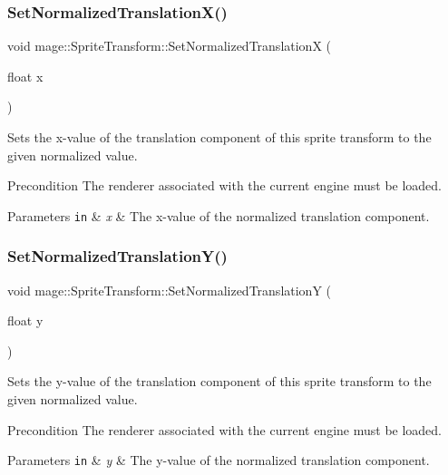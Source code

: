 \subsubsection{\texorpdfstring{Set\+Normalized\+Translation\+X()}{SetNormalizedTranslationX()}}
{\footnotesize\ttfamily void mage\+::\+Sprite\+Transform\+::\+Set\+Normalized\+TranslationX (\begin{DoxyParamCaption}\item[{float}]{x }\end{DoxyParamCaption})}

Sets the x-\/value of the translation component of this sprite transform to the given normalized value.

\begin{DoxyPrecond}{Precondition}
The renderer associated with the current engine must be loaded. 
\end{DoxyPrecond}

\begin{DoxyParams}[1]{Parameters}
\mbox{\tt in}  & {\em x} & The x-\/value of the normalized translation component. \\
\hline
\end{DoxyParams}
\hypertarget{structmage_1_1_sprite_transform_aa50268eff50bac9903f1cd2123260f6d}{}\label{structmage_1_1_sprite_transform_aa50268eff50bac9903f1cd2123260f6d} 
\subsubsection{\texorpdfstring{Set\+Normalized\+Translation\+Y()}{SetNormalizedTranslationY()}}
{\footnotesize\ttfamily void mage\+::\+Sprite\+Transform\+::\+Set\+Normalized\+TranslationY (\begin{DoxyParamCaption}\item[{float}]{y }\end{DoxyParamCaption})}

Sets the y-\/value of the translation component of this sprite transform to the given normalized value.

\begin{DoxyPrecond}{Precondition}
The renderer associated with the current engine must be loaded. 
\end{DoxyPrecond}

\begin{DoxyParams}[1]{Parameters}
\mbox{\tt in}  & {\em y} & The y-\/value of the normalized translation component. \\
\hline
\end{DoxyParams}
\hypertarget{structmage_1_1_sprite_transform_a95bfa3a9ef80d42682c41f663b818698}{}\label{structmage_1_1_sprite_transform_a95bfa3a9ef80d42682c41f663b818698} 
